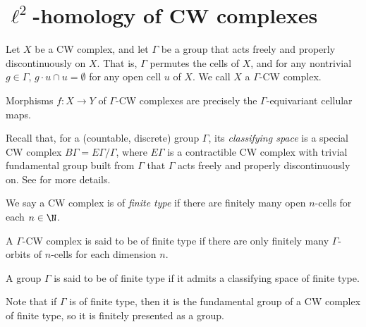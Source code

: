 \documentclass[10pt]{mypackage}
\begin{document}
\section{$\ell^2$-homology of CW complexes}%
\begin{definition}
  Let $X$ be a CW complex, and let $\Gamma$ be a group that acts freely and properly discontinuously on $X$. That is, $\Gamma$ permutes the cells of $X$, and for any nontrivial $g\in \Gamma$, $g\cdot u \cap u = \emptyset$ for any open cell $u$ of $X$. We call $X$ a $\Gamma$-CW complex.

  Morphisms $f\colon X\rightarrow Y$ of $\Gamma$-CW complexes are precisely the $\Gamma$-equivariant cellular maps.
\end{definition}
Recall that, for a (countable, discrete) group $\Gamma$, its \textit{classifying space} is a special CW complex $B\Gamma = E\Gamma/\Gamma$, where $E\Gamma$ is a contractible CW complex with trivial fundamental group built from $\Gamma$ that $\Gamma$ acts freely and properly discontinuously on. See \cite[Chapter 1.B]{hatcher_algebraic_topology} for more details.
\begin{definition}
  We say a CW complex is of \textit{finite type} if there are finitely many open $n$-cells for each $n\in \N$.

  A $\Gamma$-CW complex is said to be of finite type if there are only finitely many $\Gamma$-orbits of $n$-cells for each dimension $n$.

  A group $\Gamma$ is said to be of finite type if it admits a classifying space of finite type.
\end{definition}
Note that if $\Gamma$ is of finite type, then it is the fundamental group of a CW complex of finite type, so it is finitely presented as a group.
\end{document}
